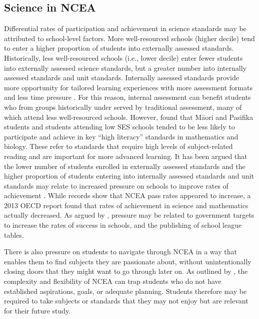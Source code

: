 \documentclass[a4paper,man,natbib]{apa6}
\begin{document}
\subsection{Science in NCEA}
Differential rates of participation and achievement in science standards may be attributed to school-level factors. More well-resourced schools (higher decile) tend to enter a higher proportion of students into externally assessed standards. Historically, less well-resourced schools (i.e., lower decile) enter fewer students into externally assessed science standards, but a greater number into internally assessed standards and unit standards. Internally assessed standards provide more opportunity for tailored learning experiences with more assessment formats and less time pressure \citep{hipkins2016ncea}. For this reason, internal assessment can benefit students who from groups historically under served by traditional assessment, many of which attend less well-resourced schools. However, \cite{wilson2017subject} found that M\={a}ori and Pasifika students and students attending low SES schools tended to be less likely to participate and achieve in key ``high literacy'' standards in mathematics and biology. These refer to standards that require high levels of subject-related reading and are important for more advanced learning. It has been argued that the lower number of students enrolled in externally assessed standards and the higher proportion of students entering into internally assessed standards and unit standards may relate to increased pressure on schools to improve rates of achievement \citep{hipkins2016ncea,wilson2017subject}. While records show that NCEA pass rates appeared to increase, a 2013 OECD report found that rates of achievement in science and mathematics actually decreased. As argued by \cite{wilson2017subject}, pressure may be related to government targets to increase the rates of success in schools, and the publishing of school league tables. 

There is also pressure on students to navigate through NCEA in a way that enables them to find subjects they are passionate about, without unintentionally closing doors that they might want to go through later on. As outlined by \cite{authority2013understanding}, the complexity and flexibility of NCEA can trap students who do not have established aspirations, goals, or adequate planning. Students therefore may be required to take subjects or standards that they may not enjoy but are relevant for their future study.  
\end{document}

